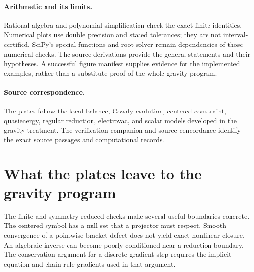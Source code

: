 \paragraph{Arithmetic and its limits.}
Rational algebra and polynomial simplification check the exact finite identities. Numerical plots use double precision and stated tolerances; they are not interval-certified. SciPy's special functions and root solver remain dependencies of those numerical checks. The source derivations provide the general statements and their hypotheses. A successful figure manifest supplies evidence for the implemented examples, rather than a substitute proof of the whole gravity program.

\paragraph{Source correspondence.}
The plates follow the local balance, Gowdy evolution, centered constraint, quasienergy, regular reduction, electrovac, and scalar models developed in the gravity treatment. The verification companion and source concordance identify the exact source passages and computational records.

\clearpage
\section{What the plates leave to the gravity program}

The finite and symmetry-reduced checks make several useful boundaries concrete. The centered symbol has a null set that a projector must respect. Smooth convergence of a pointwise bracket defect does not yield exact nonlinear closure. An algebraic inverse can become poorly conditioned near a reduction boundary. The conservation argument for a discrete-gradient step requires the implicit equation and chain-rule gradients used in that argument.

